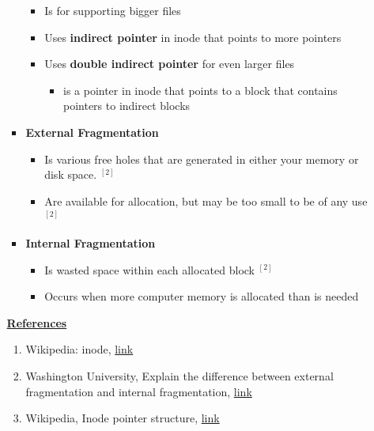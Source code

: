 \documentclass[12pt]{article}
\begin{document}
\begin{enumerate}[1.]
\begin{enumerate}[a)]
\begin{itemize}
            \begin{itemize}
                \item Is for supporting bigger files
                \item Uses \textbf{indirect pointer} in inode that points to more pointers
                \item Uses \textbf{double indirect pointer} for even larger files

                \begin{itemize}
                    \item is a pointer in inode that points to a block that contains
                    pointers to indirect blocks
                \end{itemize}
            \end{itemize}

            \item \textbf{External Fragmentation}

            \begin{itemize}
                \item Is various free holes that are generated in either your
                memory or disk space. $^{[2]}$
                \item Are available for allocation, but may be too small to be of
                any use $^{[2]}$
            \end{itemize}

            \item \textbf{Internal Fragmentation}

            \begin{itemize}
                \item Is wasted space within each allocated block $^{[2]}$
                \item Occurs when more computer memory is allocated than is needed
            \end{itemize}
        \end{itemize}

        \bigskip

        \underline{\textbf{References}}

        \begin{enumerate}[1)]
            \item Wikipedia: inode, \href{https://en.wikipedia.org/wiki/Inode}{link}
            \item Washington University, Explain the difference between external fragmentation
            and internal fragmentation, \href{https://courses.cs.washington.edu/courses/cse451/00sp/misc/quiz2sol.txt}{link}
            \item Wikipedia, Inode pointer structure, \href{https://en.wikipedia.org/wiki/Inode_pointer_structure}{link}
        \end{enumerate}


\end{enumerate}
\end{enumerate}
\end{document}
